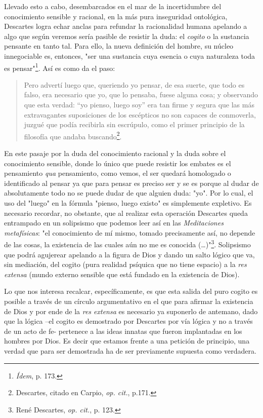 \documentclass{book}
\begin{document}
Llevado esto a cabo, desembarcados en el mar de la incertidumbre del
conocimiento sensible y racional, en la más pura inseguridad ontológica,
Descartes logra echar anclas para refundar la racionalidad humana
apelando a algo que según veremos sería pasible de resistir la duda: el
\emph{cogito} o la sustancia pensante en tanto tal. Para ello, la nueva
definición del hombre, su núcleo innegociable es, entonces, "ser una
sustancia cuya esencia o cuya naturaleza toda es pensar"\footnote{\emph{Ídem},
  p. 173.}. Así es como da el paso:

\begin{quote}
Pero advertí luego que, queriendo yo pensar, de esa suerte, que todo es
falso, era necesario que yo, que lo pensaba, fuese alguna cosa; y
observando que esta verdad: ``yo pienso, luego soy'' era tan firme y
segura que las más extravagantes suposiciones de los escépticos no son
capaces de conmoverla, juzgué que podía recibirla sin escrúpulo, como el
primer principio de la filosofía que andaba buscando\footnote{Descartes,
  citado en Carpio, \emph{op. cit.}, p.171.}.
\end{quote}

En este pasaje por la duda del conocimiento racional y la duda sobre el
conocimiento sensible, donde lo único que puede resistir los embates es
el pensamiento \emph{qua} pensamiento, como vemos, el ser quedará
homologado o identificado al pensar ya que para pensar es preciso ser y
se es porque al dudar de absolutamente todo no se puede dudar de que
alguien duda: "yo". Por lo cual, el uso del "luego" en la fórmula
"pienso, luego existo" es simplemente expletivo. Es necesario recordar,
no obstante, que al realizar esta operación Descartes queda entrampado
en un solipsismo que podemos leer así en las \emph{Meditaciones
metafísicas}: "el conocimiento de mí mismo, tomado precisamente así, no
depende de las cosas, la existencia de las cuales aún no me es conocida
(\ldots)"\footnote{René Descartes, \emph{op. cit.}, p. 123.}. Solipsismo
que podrá agujerear apelando a la figura de Dios y dando un salto lógico
que va, sin mediación, del cogito (pura realidad psíquica que no tiene
espacio) a la \emph{res extensa} (mundo externo sensible que está
fundado en la existencia de Dios).

Lo que nos interesa recalcar, específicamente, es que esta salida del
puro cogito es posible a través de un círculo argumentativo en el que
para afirmar la existencia de Dios y por ende de la \emph{res extensa}
es necesario ya suponerlo de antemano, dado que la lógica --el cogito es
demostrado por Descartes por vía lógica y no a través de un acto de fe-
pertenece a las ideas innatas que fueron implantadas en los hombres por
Dios. Es decir que estamos frente a una petición de principio, una
verdad que para ser demostrada ha de ser previamente supuesta como
verdadera.
\end{document}
